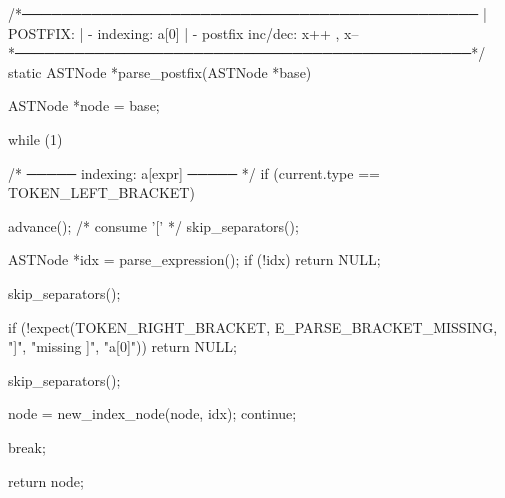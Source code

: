 \documentclass{article}
\begin{document}
/*──────────────────────────────────────────────
 | POSTFIX:
 |   - indexing: a[0]
 |   - postfix inc/dec: x++ , x--
 *──────────────────────────────────────────────*/
static ASTNode *parse_postfix(ASTNode *base)
{
    ASTNode *node = base;

    while (1) {

        /* ───── indexing: a[expr] ───── */
        if (current.type == TOKEN_LEFT_BRACKET) {

            advance(); /* consume '[' */
            skip_separators();

            ASTNode *idx = parse_expression();
            if (!idx) return NULL;

            skip_separators();

            if (!expect(TOKEN_RIGHT_BRACKET, E_PARSE_BRACKET_MISSING,
                        "]", "missing ]", "a[0]"))
                return NULL;

            skip_separators();

            node = new_index_node(node, idx);
            continue;
        }

        break;
    }

    return node;
}
\end{document}
